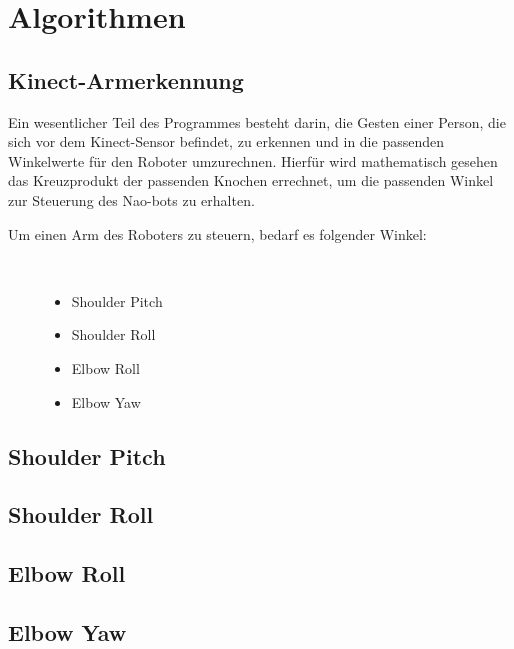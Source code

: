 \chapter{Algorithmen}
\section{Kinect-Armerkennung}
Ein wesentlicher Teil des Programmes besteht darin, die Gesten einer Person, die sich vor dem Kinect-Sensor befindet, zu erkennen und in die passenden Winkelwerte für den Roboter umzurechnen.
Hierfür wird mathematisch gesehen das Kreuzprodukt der passenden Knochen errechnet, um die passenden Winkel zur Steuerung des Nao-bots zu erhalten.

\begin{description}
	\item[Um einen Arm des Roboters zu steuern, bedarf es folgender Winkel:]~\par
	\begin{itemize}
		\item Shoulder Pitch
		\item Shoulder Roll
		\item Elbow Roll
		\item Elbow Yaw
	\end{itemize}
\end{description}

\section{Shoulder Pitch}
\section{Shoulder Roll}
\section{Elbow Roll}
\section{Elbow Yaw}